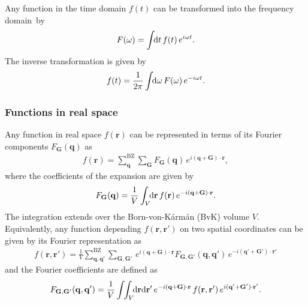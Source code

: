 Any function in the time domain $f(t)$ can be transformed into the frequency domain~by
%
\begin{align}
       F(\omega) = \int\text{\!\!d}t\,f(t)\,e^{i\omega t}.
\end{align}                                          
%
The inverse transformation is given by
%
\begin{align}
    f(t) = \frac{1}{2\pi}\int\text{\!\!d}\omega\,F(\omega)\,e^{-i\omega t}.
\end{align}

\newpage

\subsubsection{Functions in real space}
%
Any function in real space $f(\mathbf{r})$   can be represented in terms of its Fourier components $F_\mathbf{G}(\mathbf{q})$ as 
%
\begin{align}\label{fourier_real_onearg}
    f(\mathbf{r}) = \sum^\text{BZ}_\mathbf{q}\sum_\mathbf{G}F_\mathbf{G}(\mathbf{q})\,e^{i\mathbf{(q+G)\cdot r}},
\end{align}
%
where the coefficients of the expansion are given by
%
\begin{align}\label{fourier_coeff1}
    F_\mathbf{G}(\mathbf{q}) = \frac{1}{V}\int_V \text{\!\!d}\mathbf{r}\,f(\mathbf{r})\,e^{-i\mathbf{(q+G)\cdot r}}.
\end{align}
%
The integration extends over the Born-von-K\'{a}rm\'{a}n (BvK) volume $V$. Equivalently, any function depending $f(\mathbf{r,r'})$ on two spatial coordinates can be given by its Fourier representation as
%
\begin{align}
    f(\mathbf{r,r'}) = \frac{1}{V}\sum^\text{BZ}_\mathbf{q,q'}\sum_\mathbf{G,G'}\,e^{i\mathbf{(q+G)\cdot r}}F_\mathbf{G,G'}(\mathbf{q,q'})\,e^{-i\mathbf{(q'+G')\cdot r'}}
\end{align}
%
and the Fourier coefficients are defined as
%
\begin{align}\label{fourier_coeff}
      F_\mathbf{G,G'}(\mathbf{q,q'}) = \frac{1}{V}\int\!\!\int_V \text{\!\!d}\mathbf{r}\text{d}\mathbf{r'}\,e^{-i\mathbf{(q+G)\cdot r}}\,f(\mathbf{r,r'})\,e^{i\mathbf{(q'+G')\cdot r'}}.
\end{align}




